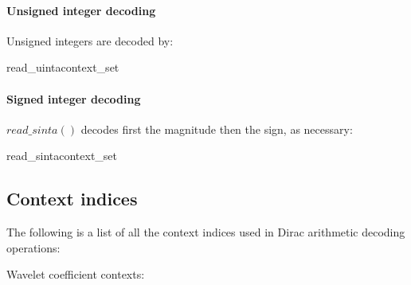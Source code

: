 \paragraph{Unsigned integer decoding \\}

Unsigned integers are decoded by:

\begin{pseudo}{read\_uinta}{context\_set}
  \bsEND
\bsEND
{}
\end{pseudo}

\paragraph{Signed integer decoding \\}

$read\_sinta()$ decodes first the magnitude then the sign, as necessary:

\begin{pseudo}{read\_sinta}{context\_set}
  \bsEND
\bsEND
{}
\end{pseudo}

\subsection{Context indices}
\label{contextindices}

The following is a list of all the context indices used in Dirac arithmetic decoding operations:

Wavelet coefficient contexts:

\SignZero\\
\SignPos\\
\SignNeg\\
\ZPZNFollowOne\\
\ZPNNFollowOne\\
\ZPFollowTwo\\
\ZPFollowThree\\
\ZPFollowFour\\
\ZPFollowFive\\
\ZPFollowSixPlus\\
\NPZNFollowOne\\
\NPNNFollowOne\\
\NPFollowTwo\\
\NPFollowThree\\
\NPFollowFour\\
\NPFollowFive\\
\NPFollowSixPlus\\
\CoeffData\\
\ZeroCodeblock\\
\QOffsetFollow\\
\QOffsetData\\
\QOffsetSign\\

